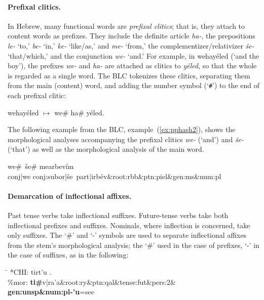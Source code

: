 \paragraph{Prefixal clitics.} In Hebrew, many functional words are 
\textit{prefixal clitics}; that is, they attach to content 
words as prefixes. They include the definite article \textit{ha-}, the prepositions 
\textit{le-} `to,' \textit{be-} `in,' \textit{ke-} `like/as,' and \textit{me-} 
`from,' the  complementizer/relativizer \textit{\v{s}e-} `that/which,' and the 
conjunction \textit{we-} `and.' For example,  in
\textsf{wehay\'eled} (`and the boy'), the prefixes \textit{we-} and \textit{ha-} 
are attached as clitics to \textit{y\'eled}, 
so that the whole is regarded as a single word. The 
BLC tokenizes these clitics, separating them from the 
main (content) word, and adding the number symbol (`\texttt{\#}') to 
the end of each prefixal clitic:
\begin{exe}
\ex  \textsf{wehay\'eled}  \quad $\mapsto$ \quad \textsf{we\# ha\# y\'eled}.
\end{exe}
The following example from the BLC, example~(\ref{ex:pphash2}), shows the morphological analyses accompanying the prefixal clitics \textit{we-} (`and') and \textit{\v{s}e-} (`that') as well as the morphological analysis of the main word.
\begin{exe}
	\ex 
	\textsf{we\#\, \v{s}e\# mearbev\'im} \\  \label{ex:pphash2}
	\textsf{conj|we conj:subor|\v{s}e\, part|irb\'ev\&root:rbb\&ptn:piel\&gen:ms\&num:pl} 
\end{exe}

\paragraph{Demarcation of inflectional affixes.}
Past tense verbs take inflectional suffixes. Future-tense verbs take both inflectional prefixes and suffixes. 
Nominals, where inflection
is concerned, take only suffixes. The `\#' and `-' symbols are used to separate inflectional
affixes from the stem's morphological analysis; the `\#' used in the case of prefixes, `-' in the
case of suffixes, as in the following:

\begin{exe}
\ex \begin{tabbing} \label{ex:pre:v:suf}
\hspace{0.6in} \= \hspace{5.5in} \kill
\textsf{*CHI:} \> \textsf{tirt\a'{u} .} \\
\textsf{\%mor:} \> \textbf{\textsf{ti}\#}\textsf{v|ra\a'{a}\&root:ry\&ptn:qal\&tense:fut\&pers:2\&
\textbf{gen:unsp\&num:pl-\a'{u}}=see}
\end{tabbing}
\end{exe}

